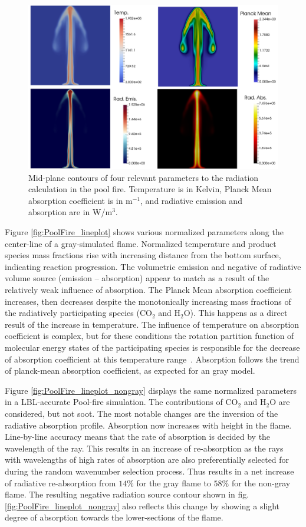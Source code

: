 \begin{figure}[!ht]
\includegraphics[width=0.9\linewidth]{figures/ch4/PoolFire_quadcomparison.png}
\caption{Mid-plane contours of four relevant parameters to the radiation calculation in the pool fire. Temperature is in Kelvin, Planck Mean absorption coefficient is in m$^{-1}$, and radiative emission and absorption are in W/m$^3$.}
\label{fig:PoolFire_quadcomparison}
\end{figure}

Figure \ref{fig:PoolFire_lineplot} shows various normalized parameters along the center-line of a gray-simulated flame. 
Normalized temperature and product species mass fractions rise with increasing distance from the bottom surface, indicating reaction progression. 
The volumetric emission and negative of radiative volume source (emission – absorption) appear to match as a result of the relatively weak influence of absorption.
The Planck Mean absorption coefficient increases, then decreases despite the monotonically increasing mass fractions of the radiatively participating species (CO$_2$ and H$_2$O). This happens as a direct result of the increase in temperature. 
The influence of temperature on absorption coefficient is complex, but for these conditions the rotation partition function of molecular energy states of the participating species is responsible for the decrease of absorption coefficient at this temperature range~\cite{Modest2013RadiativeTransfer}.
Absorption follows the trend of planck-mean absorption coefficient, as expected for an gray model.

Figure \ref{fig:PoolFire_lineplot_nongray} displays the same normalized parameters in a LBL-accurate Pool-fire simulation. The contributions of CO$_2$ and H$_2$O are considered, but not soot.
The most notable changes are the inversion of the radiative absorption profile. Absorption now increases with height in the flame. Line-by-line accuracy means that the rate of absorption is decided by the wavelength of the ray.
This results in an increase of re-absorption as the rays with wavelengths of high rates of absorption are also preferentially selected for during the random wavenumber selection process. Thus results in a net increase of radiative re-absorption from $14$\% for the gray flame to $58$\% for the non-gray flame.
The resulting negative radiation source contour shown in fig. \ref{fig:PoolFire_lineplot_nongray} also reflects this change by showing a slight degree of absorption towards the lower-sections of the flame.

